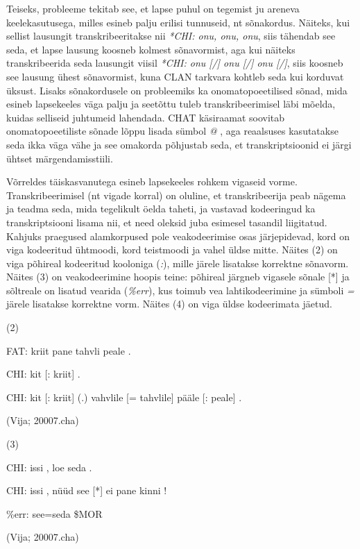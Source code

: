 \documentclass[12pt]{article}
\begin{document}
Teiseks, probleeme tekitab see, et lapse puhul on tegemist ju areneva keelekasutusega, milles esineb palju erilisi tunnuseid, nt sõnakordus. Näiteks, kui sellist lausungit transkribeeritakse nii \emph{*CHI: onu, onu, onu}, siis tähendab see seda, et lapse lausung koosneb kolmest sõnavormist, aga kui näiteks transkribeerida seda lausungit viisil \emph{*CHI: onu [/] onu [/] onu [/]}, siis koosneb see lausung ühest sõnavormist, kuna CLAN tarkvara kohtleb seda kui korduvat üksust. Lisaks sõnakordusele on probleemiks ka onomatopoeetilised sõnad, mida esineb lapsekeeles väga palju ja seetõttu tuleb transkribeerimisel läbi mõelda, kuidas selliseid juhtumeid lahendada. CHAT käsiraamat soovitab onomatopoeetiliste sõnade lõppu lisada sümbol \emph{@} \citep[72--73]{Argus2007}, aga reaalsuses kasutatakse seda ikka väga vähe ja see omakorda põhjustab seda, et transkriptsioonid ei järgi ühtset märgendamisstiili.

Võrreldes täiskasvanutega esineb lapsekeeles rohkem vigaseid vorme. Transkribeerimisel (nt vigade korral) on oluline, et transkribeerija peab nägema ja teadma seda, mida tegelikult öelda taheti, ja vastavad kodeeringud ka transkriptsiooni lisama nii, et need oleksid juba esimesel tasandil liigitatud. \citep[74]{Argus2007} Kahjuks praegused alamkorpused pole veakodeerimise osas järjepidevad, kord on viga kodeeritud ühtmoodi, kord teistmoodi ja vahel üldse mitte. Näites (2) on viga põhireal kodeeritud kooloniga (\emph{:}), mille järele lisatakse korrektne sõnavorm. Näites (3) on veakodeerimine hoopis teine: põhireal järgneb vigasele sõnale [*] ja sõltreale on lisatud vearida (\emph{\%err}), kus  toimub vea lahtikodeerimine ja sümboli \emph{=} järele lisatakse korrektne vorm. Näites (4) on viga üldse kodeerimata jäetud.
\hfill

(2)
\begin{description}
    \item*FAT: kriit pane tahvli peale .
    \item*CHI: kit [: kriit] .
    \item*CHI: kit [: kriit] (.) vahvlile [= tahvlile] pääle [: peale] .
    \item(Vija; 20007.cha)
\end{description}
\hfill

(3)
\begin{description}
    \item*CHI: issi , loe seda .
    \item*CHI: issi , nüüd see [*] ei pane kinni !
    \item\%err: see=seda \$MOR
    \item(Vija; 20007.cha)
\end{description}
\hfill
\end{document}
